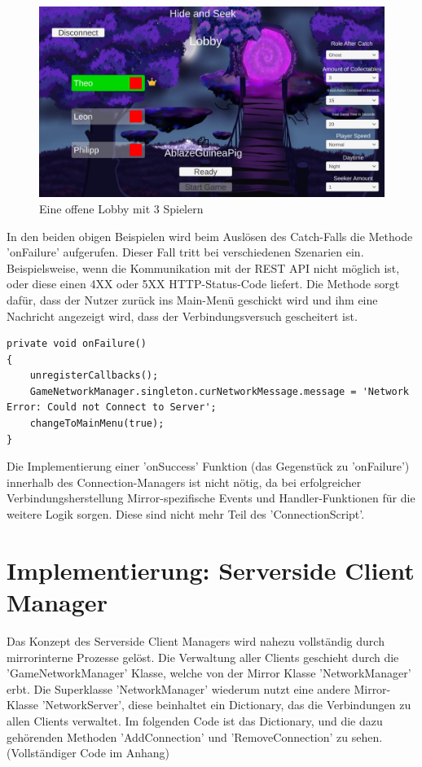 \begin{figure}[H]
	\centering
	\includegraphics[width=120mm]{images/prototyp_lobby_menu.png}
	\caption[Prototyp Lobby Menu]{Eine offene Lobby mit 3 Spielern}
	\label{pic:prototyp_lobby_menu}
\end{figure}

In den beiden obigen Beispielen wird beim Auslösen des Catch-Falls die Methode 'onFailure' aufgerufen. Dieser Fall tritt bei verschiedenen Szenarien ein. Beispielsweise, wenn die Kommunikation mit der REST API nicht möglich ist, oder diese einen 4XX oder 5XX HTTP-Status-Code liefert. Die Methode sorgt dafür, dass der Nutzer zurück ins Main-Menü geschickt wird und ihm eine Nachricht angezeigt wird, dass der Verbindungsversuch gescheitert ist.

\begin{lstlisting}[caption= ConnectionScript.cs onFailure()]
private void onFailure()
{
	unregisterCallbacks();
	GameNetworkManager.singleton.curNetworkMessage.message = 'Network Error: Could not Connect to Server';
	changeToMainMenu(true);
}

\end{lstlisting}

Die Implementierung einer 'onSuccess' Funktion (das Gegenstück zu 'onFailure') innerhalb des Connection-Managers ist nicht nötig, da bei erfolgreicher Verbindungsherstellung Mirror-spezifische Events und Handler-Funktionen für die weitere Logik sorgen. Diese sind nicht mehr Teil des 'ConnectionScript'.

\section{Implementierung: Serverside Client Manager}

Das Konzept des Serverside Client Managers wird nahezu vollständig durch mirrorinterne Prozesse gelöst. Die Verwaltung aller Clients geschieht durch die 'GameNetworkManager' Klasse, welche von der Mirror Klasse 'NetworkManager' erbt. Die Superklasse 'NetworkManager' wiederum nutzt eine andere Mirror-Klasse 'NetworkServer', diese beinhaltet ein Dictionary, das die Verbindungen zu allen Clients verwaltet. Im folgenden Code ist das Dictionary, und die dazu gehörenden Methoden 'AddConnection' und 'RemoveConnection' zu sehen. (Vollständiger Code im Anhang)

